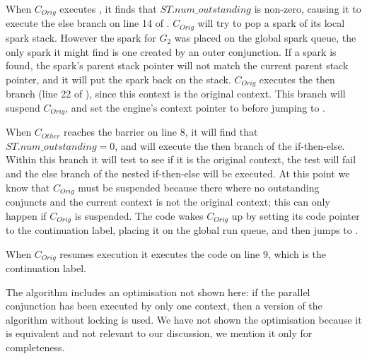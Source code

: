 \begin{description}
    When $C_{Orig}$ executes \joinandcontinue,
    it finds that $ST.num\_outstanding$ is non-zero,
    causing it to execute the else branch on line 14 of \joinandcontinue.
    $C_{Orig}$ will try to pop a spark of its local spark stack.
    However the spark for $G_2$ was placed on the global
    spark queue,
    the only spark it might find is one created by an outer conjunction.
    If a spark is found, the spark's parent stack pointer will not match the
    current parent stack pointer,
    and it will put the spark back on the stack.
    $C_{Orig}$ executes the then branch (line 22 of \joinandcontinue), since this
    context is the original context.
    This branch will suspend $C_{Orig}$,
    and set the engine's context pointer to \NULL
    before jumping to \idle.

    When $C_{Other}$ reaches the barrier on line 8,
    it will find that $ST.num\_outstanding = 0$,
    and will execute the then branch of the if-then-else.
    Within this branch it will test to see if it is the original
    context,
    the test will fail and the else branch of the nested if-then-else
    will be executed.
    At this point we know that $C_{Orig}$ must be suspended because
    there where no outstanding conjuncts and the current context is not
    the original context;
    this can only happen if $C_{Orig}$ is suspended.
    The code wakes $C_{Orig}$ up by
    setting its code pointer to the continuation label,
    placing it on the global run queue,
    and then jumps to \idle.

    When $C_{Orig}$ resumes execution it executes the code on line 9,
    which is the continuation label.

\end{description}

The algorithm includes an optimisation not shown here:
if the parallel conjunction has been executed by only one context,
then a version of the algorithm without locking is used.
We have not shown the optimisation because it is equivalent and not relevant
to our discussion,
we mention it only for completeness.

